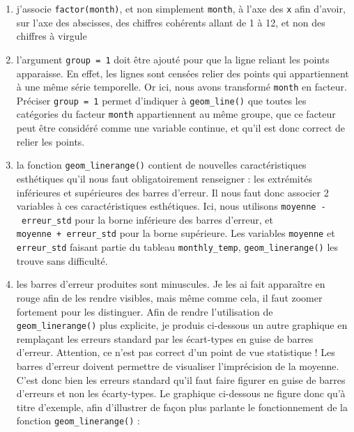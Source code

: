 \documentclass[a4paperpaper,]{article}
\providecommand{\tightlist}{%
  \setlength{\itemsep}{0pt}\setlength{\parskip}{0pt}}
\theoremstyle{definition}
\theoremstyle{definition}
\theoremstyle{definition}
\theoremstyle{remark}
\begin{document}
\begin{enumerate}
\def\labelenumi{\arabic{enumi}.}
\tightlist
\item
  j'associe \texttt{factor(month)}, et non simplement \texttt{month}, à
  l'axe des \texttt{x} afin d'avoir, sur l'axe des abscisses, des
  chiffres cohérents allant de 1 à 12, et non des chiffres à virgule
\item
  l'argument \texttt{group\ =\ 1} doit être ajouté pour que la ligne
  reliant les points apparaisse. En effet, les lignes sont censées
  relier des points qui appartiennent à une même série temporelle. Or
  ici, nous avons transformé \texttt{month} en facteur. Préciser
  \texttt{group\ =\ 1} permet d'indiquer à \texttt{geom\_line()} que
  toutes les catégories du facteur \texttt{month} appartiennent au même
  groupe, que ce facteur peut être considéré comme une variable
  continue, et qu'il est donc correct de relier les points.
\item
  la fonction \texttt{geom\_linerange()} contient de nouvelles
  caractéristiques esthétiques qu'il nous faut obligatoirement
  renseigner : les extrémités inférieures et supérieures des barres
  d'erreur. Il nous faut donc associer 2 variables à ces
  caractéristiques esthétiques. Ici, nous utilisons
  \texttt{moyenne\ -\ erreur\_std} pour la borne inférieure des barres
  d'erreur, et \texttt{moyenne\ +\ erreur\_std} pour la borne
  supérieure. Les variables \texttt{moyenne} et \texttt{erreur\_std}
  faisant partie du tableau \texttt{monthly\_temp},
  \texttt{geom\_linerange()} les trouve sans difficulté.
\item
  les barres d'erreur produites sont minuscules. Je les ai fait
  apparaître en rouge afin de les rendre visibles, mais même comme cela,
  il faut zoomer fortement pour les distinguer. Afin de rendre
  l'utilisation de \texttt{geom\_linerange()} plus explicite, je produis
  ci-dessous un autre graphique en remplaçant les erreurs standard par
  les écart-types en guise de barres d'erreur. Attention, ce n'est pas
  correct d'un point de vue statistique ! Les barres d'erreur doivent
  permettre de visualiser l'imprécision de la moyenne. C'est donc bien
  les erreurs standard qu'il faut faire figurer en guise de barres
  d'erreurs et non les écarty-types. Le graphique ci-dessous ne figure
  donc qu'à titre d'exemple, afin d'illustrer de façon plus parlante le
  fonctionnement de la fonction \texttt{geom\_linerange()} :
\end{enumerate}
\end{document}
